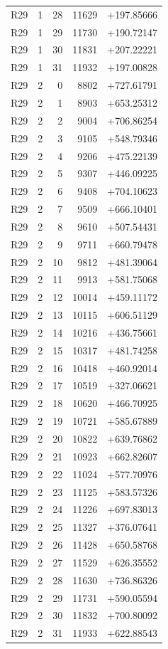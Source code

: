 \documentclass[journal,onecolumn,10pt]{IEEEtran}
\begin{document}
\begin{longtable}{llrrr}
R29 & 1 & 28 & 11629 & +197.85666 \\
R29 & 1 & 29 & 11730 & +190.72147 \\
R29 & 1 & 30 & 11831 & +207.22221 \\
R29 & 1 & 31 & 11932 & +197.00828 \\
R29 & 2 & 0 & 8802 & +727.61791 \\
R29 & 2 & 1 & 8903 & +653.25312 \\
R29 & 2 & 2 & 9004 & +706.86254 \\
R29 & 2 & 3 & 9105 & +548.79346 \\
R29 & 2 & 4 & 9206 & +475.22139 \\
R29 & 2 & 5 & 9307 & +446.09225 \\
R29 & 2 & 6 & 9408 & +704.10623 \\
R29 & 2 & 7 & 9509 & +666.10401 \\
R29 & 2 & 8 & 9610 & +507.54431 \\
R29 & 2 & 9 & 9711 & +660.79478 \\
R29 & 2 & 10 & 9812 & +481.39064 \\
R29 & 2 & 11 & 9913 & +581.75068 \\
R29 & 2 & 12 & 10014 & +459.11172 \\
R29 & 2 & 13 & 10115 & +606.51129 \\
R29 & 2 & 14 & 10216 & +436.75661 \\
R29 & 2 & 15 & 10317 & +481.74258 \\
R29 & 2 & 16 & 10418 & +460.92014 \\
R29 & 2 & 17 & 10519 & +327.06621 \\
R29 & 2 & 18 & 10620 & +466.70925 \\
R29 & 2 & 19 & 10721 & +585.67889 \\
R29 & 2 & 20 & 10822 & +639.76862 \\
R29 & 2 & 21 & 10923 & +662.82607 \\
R29 & 2 & 22 & 11024 & +577.70976 \\
R29 & 2 & 23 & 11125 & +583.57326 \\
R29 & 2 & 24 & 11226 & +697.83013 \\
R29 & 2 & 25 & 11327 & +376.07641 \\
R29 & 2 & 26 & 11428 & +650.58768 \\
R29 & 2 & 27 & 11529 & +626.35552 \\
R29 & 2 & 28 & 11630 & +736.86326 \\
R29 & 2 & 29 & 11731 & +590.05594 \\
R29 & 2 & 30 & 11832 & +700.80092 \\
R29 & 2 & 31 & 11933 & +622.88543 \\
\end{longtable}
\end{document}
